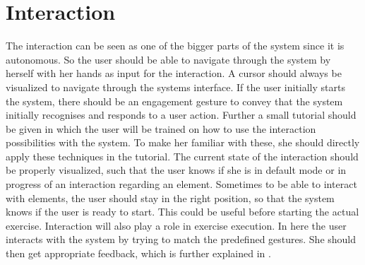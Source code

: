 \section{Interaction}\label{4_2_interaction}
The interaction can be seen as one of the bigger parts of the system since it is autonomous. So the user should be able to navigate through the system by herself with her hands as input for the interaction. A cursor should always be visualized to navigate through the systems interface. If the user initially starts the system, there should be an engagement gesture to convey that the system initially recognises and responds to a user action. Further a small tutorial should be given in which the user will be trained on how to use the interaction possibilities with the system. To make her familiar with these, she should directly apply these techniques in the tutorial. The current state of the interaction should be properly visualized, such that the user knows if she is in default mode or in progress of an interaction regarding an element. Sometimes to be able to interact with elements, the user should stay in the right position, so that the system knows if the user is ready to start. This could be useful before starting the actual exercise. Interaction will also play a role in exercise execution. In here the user interacts with the system by trying to match the predefined gestures. She should then get appropriate feedback, which is further explained in \textbf{}.

\begin{comment}
- user can and should interact with the system
\\- Cursor visualization as hand image
\\- Engagement gesture for first interaction with Kinect (One hand over shoulder)
\\- She should be instructed how to interact 
\\- Different interaction methods should be provided to prevent failing on one (tutorial --> clicking (variations) + scrolling)
\end{comment}